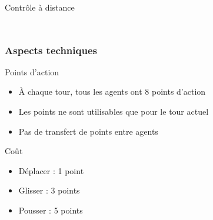 \documentclass{beamer}
\begin{document}
\begin{frame}{Contrôle à distance}
\begin{columns}[T]
\begin{column}{0.7\textwidth}
{        }
    \end{column}
    \end{columns}    
\end{frame}

\begin{frame}
    \frametitle{Aspects techniques}
    \begin{block}{Points d'action}
        \begin{itemize}
            \item À chaque tour, tous les agents ont 8 points d'action
            \item Les points ne sont utilisables que pour le tour actuel
            \item Pas de transfert de points entre agents
        \end{itemize}
    \end{block}
    \begin{block}{Coût}
        \begin{itemize}
            \item Déplacer : 1 point
            \item Glisser : 3 points
            \item Pousser : 5 points
        \end{itemize}
    \end{block}
\end{frame}
\end{document}
